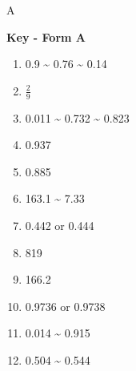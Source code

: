 \documentclass{article}
\providecommand{\tightlist}{\setlength{\itemsep}{0pt}\setlength{\parskip}{0pt}}
\begin{document}
\vfill \hfill {\tiny A}
\pagebreak

\textbf{Key - Form A}
\begin{enumerate}[label=\arabic*.]
\tightlist
\item 0.9 \textasciitilde{} 0.76 \textasciitilde{} 0.14
\item \(\frac{2}{9}\)
\item 0.011 \textasciitilde{} 0.732 \textasciitilde{} 0.823
\item 0.937
\item 0.885
\item 163.1 \textasciitilde{} 7.33
\item 0.442 or 0.444
\item 819
\item 166.2
\item 0.9736 or 0.9738
\item 0.014 \textasciitilde{} 0.915
\item 0.504 \textasciitilde{} 0.544
\end{enumerate}
\end{document}
